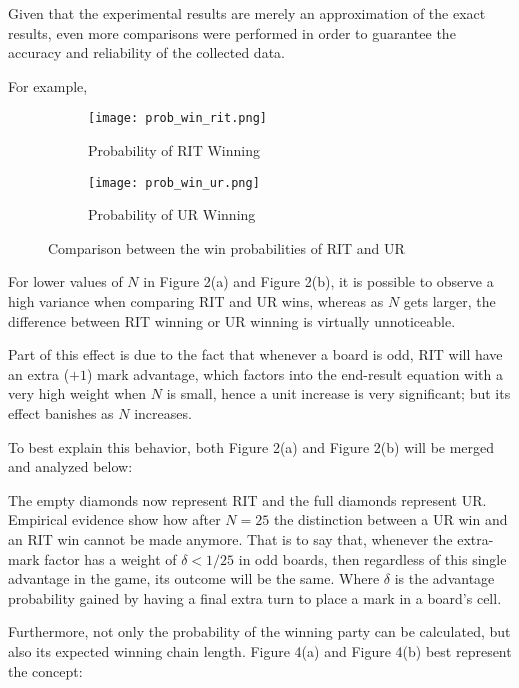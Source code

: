\documentclass[12pt]{article}
\theoremstyle{definition}
\theoremstyle{theorem}
\begin{document}
Given that the experimental results are merely an approximation of the exact results, even more comparisons were performed in order to guarantee the accuracy and reliability of the collected data.

For example,

\begin{figure}[H]
  \centering
  \begin{subfigure}{.5\textwidth}
    \centering
    \texttt{[image: prob\_win\_rit.png]}
    \caption{Probability of RIT Winning}
  \end{subfigure}%
  \begin{subfigure}{.5\textwidth}
    \centering
    \texttt{[image: prob\_win\_ur.png]}
    \caption{Probability of UR Winning}
  \end{subfigure}
  \caption{Comparison between the win probabilities of RIT and UR}
\end{figure}

For lower values of $N$ in Figure 2(a) and Figure 2(b), it is possible to observe a high variance when comparing RIT and UR wins, whereas as $N$ gets larger, the difference between RIT winning or UR winning is virtually unnoticeable.

Part of this effect is due to the fact that whenever a board is odd, RIT will have an extra ($+1$) mark advantage, which factors into the end-result equation with a very high weight when $N$ is small, hence a unit increase is very significant; but its effect banishes as $N$ increases.

To best explain this behavior, both Figure 2(a) and Figure 2(b) will be merged and analyzed below:


The empty diamonds now represent RIT and the full diamonds represent UR. Empirical evidence show how after $N = 25$ the distinction between a UR win and an RIT win cannot be made anymore. That is to say that, whenever the extra-mark factor has a weight of $\delta < 1/25$ in odd boards, then regardless of this single advantage in the game, its outcome will be the same. Where $\delta$ is the advantage probability gained by having a final extra turn to place a mark in a board's cell.


Furthermore, not only the probability of the winning party can be calculated, but also its expected winning chain length. Figure 4(a) and Figure 4(b) best represent the concept:
\end{document}
